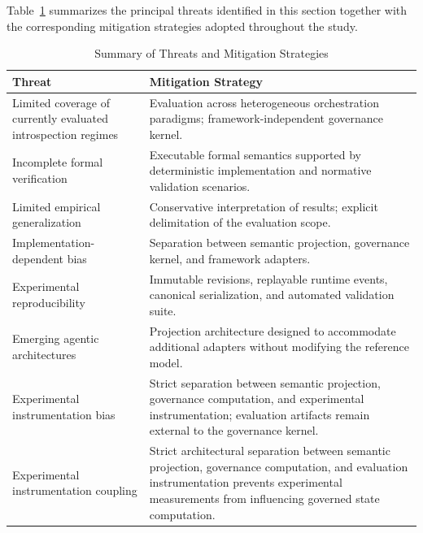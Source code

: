 \documentclass[10pt]{article}
\begin{document}
Table~\ref{tab:mitigation_strategies} summarizes the principal threats identified in this section together with the corresponding mitigation strategies adopted throughout the study.

\begin{table}[t]
\caption{Summary of Threats and Mitigation Strategies}
\label{tab:mitigation_strategies}
\centering
\begin{tabular}{p{4.2cm}p{3.9cm}}
\toprule
\textbf{Threat} & \textbf{Mitigation Strategy} \\
\midrule
Limited coverage of currently evaluated introspection regimes &
Evaluation across heterogeneous orchestration paradigms; framework-independent governance kernel. \\

Incomplete formal verification &
Executable formal semantics supported by deterministic implementation and normative validation scenarios. \\

Limited empirical generalization &
Conservative interpretation of results; explicit delimitation of the evaluation scope. \\

Implementation-dependent bias &
Separation between semantic projection, governance kernel, and framework adapters. \\

Experimental reproducibility &
Immutable revisions, replayable runtime events, canonical serialization, and automated validation suite. \\

Emerging agentic architectures &
Projection architecture designed to accommodate additional adapters without modifying the reference model. \\

Experimental instrumentation bias &
Strict separation between semantic projection, governance computation, and experimental instrumentation; evaluation artifacts remain external to the governance kernel. \\

Experimental instrumentation coupling &
Strict architectural separation between semantic projection, governance computation, and evaluation instrumentation prevents experimental measurements from influencing governed state computation. \\

\bottomrule
\end{tabular}
\end{table}
\end{document}

